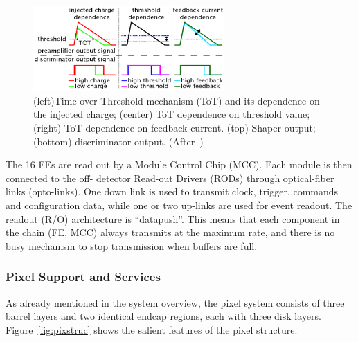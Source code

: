 \begin{figure}[!htbp]
\centering
\includegraphics[width=0.65\textwidth]{tot.png}
\caption{\label{fig:tot} (left)Time-over-Threshold mechanism (ToT) and its dependence on the injected charge; (center) ToT dependence on threshold value; (right) ToT dependence on feedback current.
 (top) Shaper output; (bottom) discriminator output. (After~\cite{AtlasVertexing2009})}
\end{figure}

The 16 FEs are read out by a Module Control Chip (MCC). Each module is then connected to the off-
detector Read-out Drivers (RODs) through optical-fiber links (opto-links).
One down link is used to transmit
clock, trigger, commands and configuration data, while one or two up-links are used for event
readout.
The readout (R/O) architecture is ``datapush''.
This means that each component in the chain (FE, MCC) always transmits at the maximum
rate, and there is no busy mechanism to stop transmission when buffers are full. 


\subsubsection{Pixel Support and Services}
\label{sec:pixelservices}

As already mentioned in the system overview, the pixel system consists of three barrel layers and two identical endcap regions, each with three disk layers. Figure~\ref{fig:pixstruc} shows the salient 
features of the pixel structure.

